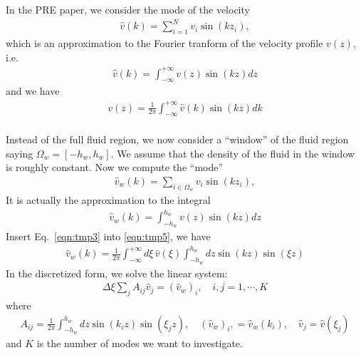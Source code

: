 \documentclass[aip,jcp,a4paper,reprint,onecolumn]{revtex4-1}
\begin{document}
\noindent
In the PRE paper, we consider the mode of the velocity
\begin{align}
  \hat v(k) = \sum_{i=1}^N v_i \sin(k z_i),
\end{align}
which is an approximation to the Fourier tranform of the velocity profile $v(z)$, i.e.
\begin{align}
  \hat v(k) = \int_{-\infty}^{+\infty} v(z) \sin(kz) dz
\end{align}
and we have
\begin{align}\label{eqn:tmp3}
  v(z) = \frac1{2\pi}\int_{-\infty}^{+\infty} \hat v(k)\sin(kz) dk
\end{align}\\

\noindent
Instead of the full fluid region, we now consider a ``window'' of the fluid region saying
$\Omega_w = [-h_w, h_w]$.
We assume that the density of the fluid in the window is roughly constant.
Now we compute the ``mode''
\begin{align}
  \hat v_w(k) = \sum_{i\in\Omega_w} v_i \sin(k z_i),
\end{align}
It is actually the approximation to the integral
\begin{align}\label{eqn:tmp5}
  \hat v_w(k) = \int_{-h_w}^{h_w} v(z) \sin(kz) dz
\end{align}
Insert Eq.~\eqref{eqn:tmp3} into \eqref{eqn:tmp5}, we have
\begin{align}
  \hat v_w(k) = \frac{1}{2\pi}\int_{-\infty}^{+\infty} d\xi \,\hat v(\xi) \int_{-h_w}^{h_w}dz  \sin(kz) \sin(\xi z)
\end{align}
In the discretized form, we solve the linear system:
\begin{align}\label{eqn:tmp7}
  \Delta \xi\sum_j A_{ij} \hat v_j = (\hat v_w)_i, \quad i,j = 1, \cdots, K
\end{align}
where
\begin{align}
  A_{ij} = \frac{1}{2\pi} \int_{-h_w}^{h_w}dz  \sin(k_i z) \sin(\xi_j z), \quad (\hat v_w)_i,  = \hat v_w(k_i), \quad \hat v_j  =  \hat v(\xi_j) 
\end{align}
and $K$ is the number of modes we want to investigate.
\\
\end{document}
